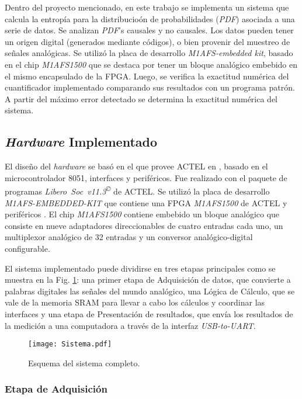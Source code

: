 Dentro del proyecto mencionado, en este trabajo se implementa un sistema que calcula la entropía para la distribucio\'on de probabilidades (\emph{PDF}) asociada a una serie de datos.
Se analizan \emph{PDF}'s causales y no causales.
Los datos pueden tener un origen digital (generados mediante códigos), o bien provenir del muestreo de señales analógicas.
Se utilizó la placa de desarrollo \textit{M1AFS-embedded kit}, basado en el chip \textit{M1AFS1500} que se destaca por tener un bloque analógico embebido en el mismo encapsulado de la FPGA.
Luego, se verifica la exactitud numérica del cuantificador implementado comparando sus resultados con un programa patrón. A partir del máximo error detectado se determina la exactitud numérica del sistema.

\subsection{\textit{Hardware} Implementado}
\label{sec:Hardware}

El diseño del \textit{hardware} se basó en el que provee ACTEL en \cite{Core8051sH}, basado en el microcontrolador 8051, interfaces y periféricos.
Fue realizado con el paquete de programas \textit{Libero~Soc~v11.3\textsuperscript\copyright} de ACTEL.
Se utilizó la placa de desarrollo \textit{M1AFS-EMBEDDED-KIT} que contiene una FPGA \textit{M1AFS1500} de ACTEL y periféricos \cite{actelM1AFS1500}.
El chip \textit{M1AFS1500} contiene embebido un bloque analógico que consiste en nueve adaptadores direccionables de cuatro entradas cada uno, un multiplexor analógico de 32 entradas y un conversor analógico-digital configurable.

El sistema implementado puede dividirse en tres etapas principales como se muestra en la Fig. \ref{Fig:Sistema}: una primer etapa de Adquisición de datos, que convierte a palabras digitales las señales del mundo analógico, una Lógica de Cálculo, que se vale de la memoria SRAM para llevar a cabo los cálculos y coordinar las interfaces y una etapa de Presentación de resultados, que envía los resultados de la medición a una computadora a través de la interfaz \textit{USB-to-UART}.

\begin{figure}
	\centering
	\texttt{[image: Sistema.pdf]}\\
	\caption{Esquema del sistema completo.}\label{Fig:Sistema}
\end{figure}

\subsubsection{Etapa de Adquisición}

